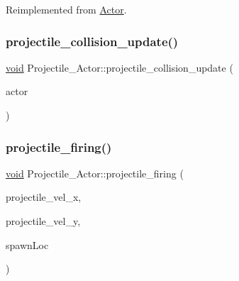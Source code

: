 Reimplemented from \hyperlink{classActor_a47101d6275509662bf6c84c3f3439696}{Actor}.

\mbox{\label{classProjectile__Actor_aa81c08d48039d932378d9579628e91e9}} 
\subsubsection{\texorpdfstring{projectile\+\_\+collision\+\_\+update()}{projectile\_collision\_update()}}
{\footnotesize\ttfamily \hyperlink{imgui__impl__opengl3__loader_8h_ac668e7cffd9e2e9cfee428b9b2f34fa7}{void} Projectile\+\_\+\+Actor\+::projectile\+\_\+collision\+\_\+update (\begin{DoxyParamCaption}\item[{std\+::shared\+\_\+ptr$<$ \hyperlink{classNPC__Actor}{N\+P\+C\+\_\+\+Actor} $>$}]{actor }\end{DoxyParamCaption})}

\mbox{\label{classProjectile__Actor_a04cc0baaa196235c85f628c92327c23b}} 
\subsubsection{\texorpdfstring{projectile\+\_\+firing()}{projectile\_firing()}}
{\footnotesize\ttfamily \hyperlink{imgui__impl__opengl3__loader_8h_ac668e7cffd9e2e9cfee428b9b2f34fa7}{void} Projectile\+\_\+\+Actor\+::projectile\+\_\+firing (\begin{DoxyParamCaption}\item[{float}]{projectile\+\_\+vel\+\_\+x,  }\item[{float}]{projectile\+\_\+vel\+\_\+y,  }\item[{std\+::shared\+\_\+ptr$<$ \hyperlink{classGun__Actor}{Gun\+\_\+\+Actor} $>$}]{spawn\+Loc }\end{DoxyParamCaption})}

\mbox{\label{classProjectile__Actor_af9d53296ef36ff9c63acaaea996366ce}} 
